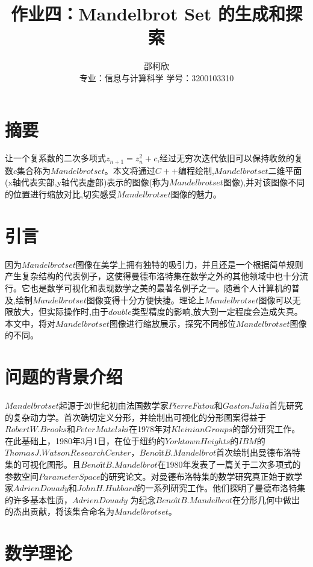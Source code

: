 \documentclass{ctexart}
\title{作业四：Mandelbrot Set 的生成和探索}
\author{邵柯欣 \\ 专业：信息与计算科学 学号：3200103310}
\begin{document}
\maketitle

\section{摘要}

让一个复系数的二次多项式$z_{n+1}=z_n^2+c$,经过无穷次迭代依旧可以保持收敛的复数${c}$集合称为$Mandelbrot set$。本文将通过$C++$编程绘制,$Mandelbrot set$二维平面(x轴代表实部,y轴代表虚部)表示的图像(称为$Mandelbrot set$图像),并对该图像不同的位置进行缩放对比,切实感受$Mandelbrot set$图像的魅力。

\section{引言}

因为$Mandelbrot set$图像在美学上拥有独特的吸引力，并且还是一个根据简单规则产生复杂结构的代表例子，这使得曼德布洛特集在数学之外的其他领域中也十分流行。它也是数学可视化和表现数学之美的最著名例子之一。随着个人计算机的普及,绘制$Mandelbrot set$图像变得十分方便快捷。理论上$Mandelbrot set$图像可以无限放大，但实际操作时,由于$double$类型精度的影响,放大到一定程度会造成失真。本文中，将对$Mandelbrot set$图像进行缩放展示，探究不同部位$Mandelbrot set$图像的不同。

\section{问题的背景介绍}

$Mandelbrot set$起源于20世纪初由法国数学家$Pierre Fatou$和$Gaston Julia$首先研究的复杂动力学。首次确切定义分形，并绘制出可视化的分形图案得益于$Robert W. Brooks$和$Peter Matelski$在1978年对$Kleinian Groups$的部分研究工作。在此基础上，1980年3月1日，在位于纽约的$Yorktown Heights$的$IBM$的$Thomas J. Watson Research Center$，$Benoît B. Mandelbrot$首次绘制出曼德布洛特集的可视化图形。且$Benoît B. Mandelbrot$在1980年发表了一篇关于二次多项式的参数空间$Parameter Space$的研究论文。对曼德布洛特集的数学研究真正始于数学家$Adrien Douady$和$John H. Hubbard$的一系列研究工作。他们探明了曼德布洛特集的许多基本性质，$Adrien Douady$ 为纪念$Benoît B. Mandelbrot$在分形几何中做出的杰出贡献，将该集合命名为$Mandelbrot set$\cite{daahjhudp1985,}。\par

\section{数学理论}
\end{document}
